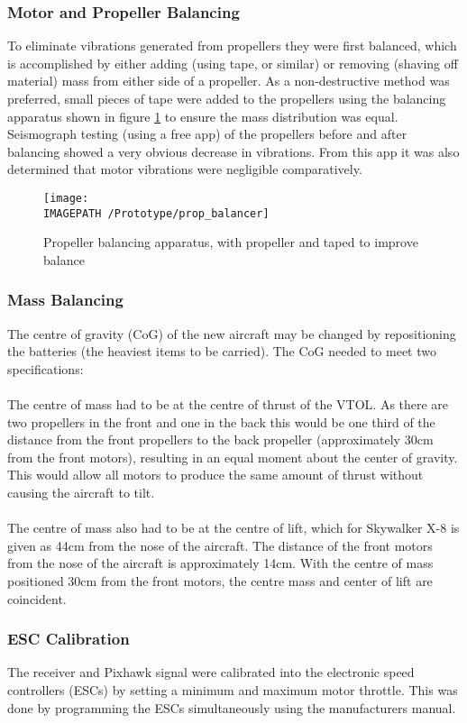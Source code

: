 \subsubsection*{Motor and Propeller Balancing}
To eliminate vibrations generated from propellers they were first balanced, which is accomplished by either adding (using tape, or similar) or removing (shaving off material) mass from either side of a propeller. As a non-destructive method was preferred, small pieces of tape were added to the propellers using the balancing apparatus shown in figure \ref{fig:propbalancing} to ensure the mass distribution was equal.  Seismograph testing (using a free app) of the propellers before and after balancing showed a very obvious decrease in vibrations. From this app it was also determined that motor vibrations were negligible comparatively.
\begin{figure}[!ht]
	\centering
	\texttt{[image: \\IMAGEPATH /Prototype/prop\_balancer]}
	\caption{Propeller balancing apparatus, with propeller and taped to improve balance}
	\label{fig:propbalancing}
\end{figure}

\subsubsection*{Mass Balancing}
The centre of gravity (CoG) of the new aircraft may be changed by repositioning the batteries (the heaviest items to be carried). The CoG needed to meet two specifications:
	\\\\The centre of mass had to be at the centre of thrust of the VTOL. As there are two propellers in the front and one in the back this would be one third of the distance from the front propellers to the back propeller (approximately 30cm from the front motors), resulting in an equal moment about the center of gravity. This would allow all motors to produce the same amount of thrust without causing the aircraft to tilt.
	\\\\The centre of mass also had to be at the centre of lift, which for Skywalker X-8 is given as 44cm from the nose of the aircraft. The distance of the front motors from the nose of the aircraft is approximately 14cm. With the centre of mass positioned 30cm from the front motors, the centre mass and center of lift are coincident.
\subsubsection*{ESC Calibration}
The receiver and Pixhawk signal were calibrated into the electronic speed controllers (ESCs) by setting a minimum and maximum motor throttle. This was done by programming the ESCs simultaneously using the manufacturers manual.


